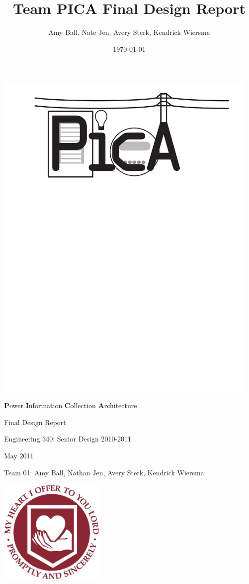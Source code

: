 \documentclass[11pt,letterpaper,titlepage]{article}
\title{Team PICA Final Design Report}
\date{\today}
\author{Amy Ball, Nate Jen, Avery Sterk, Kendrick Wiersma}
\begin{document}
\begin{titlepage}
\begin{center}
\includegraphics[width=5in]{includes/TeamPicaLogo}

{\LARGE \textbf{P}ower \textbf{I}nformation \textbf{C}ollection \textbf{A}rchitecture}

\vspace{0.5in}

{\LARGE Final Design Report}
\vspace{1in}

{\Large Engineering 340: Senior Design 2010-2011}

{\Large May 2011} %

{\Large Team 01: Amy Ball, Nathan Jen, Avery Sterk, Kendrick Wiersma}
\vspace{0.25in}

\includegraphics[height=2in]{includes/CalvinLogo}


\end{center}
\end{titlepage}
\end{document}
